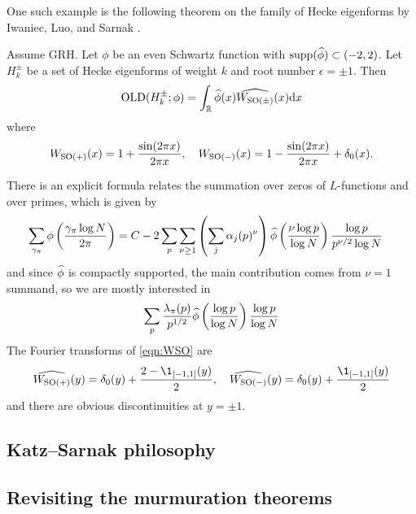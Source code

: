 One such example is the following theorem on the family of Hecke eigenforms by Iwaniec, Luo, and Sarnak \cite{iwaniec2000low}.
\begin{theorem}
    Assume GRH. Let $\phi$ be an even Schwartz function with $\mathrm{supp}(\widehat{\phi}) \subset (-2, 2)$.
    Let $H_k^\pm$ be a set of Hecke eigenforms of weight $k$ and root number $\epsilon = \pm 1$.
    Then
    \begin{equation}
        \mathrm{OLD}(H_k^\pm; \phi) = \int_{\mathbb{R}} \widehat{\phi}(x) \widehat{W_{\mathrm{SO}(\pm)}}(x) \mathrm{d} x
    \end{equation}
    where
    \begin{equation}
        \label{eqn:WSO}
        W_{\mathrm{SO}(+)}(x) = 1 + \frac{\sin(2\pi x)}{2 \pi x}, \quad W_{\mathrm{SO}(-)}(x) = 1 - \frac{\sin(2\pi x)}{2 \pi x} + \delta_0(x).
    \end{equation}
\end{theorem}
There is an explicit formula relates the summation over zeros of $L$-functions and over primes, which is given by \cite[Section 4]{iwaniec2000low}
\begin{align*}
    \sum_{\gamma_\pi} \phi\left(\frac{\gamma_\pi \log N}{2\pi}\right) &= C - 2 \sum_p \sum_{\nu \ge 1} \left(\sum_{j} \alpha_j(p)^\nu\right) \widehat{\phi}\left(\frac{\nu \log p}{\log N}\right) \frac{\log p}{p^{\nu/2} \log N}
\end{align*}
and since $\widehat{\phi}$ is compactly supported, the main contribution comes from $\nu = 1$ summand, so we are mostly interested in 
\begin{equation}
    \sum_{p} \frac{\lambda_\pi(p)}{p^{1/2}} \widehat{\phi}\left(\frac{\log p}{\log N}\right) \frac{\log p}{\log N} 
\end{equation}
The Fourier transforms of \eqref{eqn:WSO} are
\begin{equation}
    \what{W_{\SO(+)}}(y) = \delta_0(y) + \frac{2 - \1_{[-1, 1]}(y)}{2}, \quad \what{W_{\SO(-)}}(y) = \delta_0(y) + \frac{\1_{[-1, 1]}(y)}{2}
\end{equation}
and there are obvious discontinuities at $y = \pm 1$.


\cite{lowry2025murmurations}


\subsection{Katz--Sarnak philosophy}


\subsection{Revisiting the murmuration theorems}

